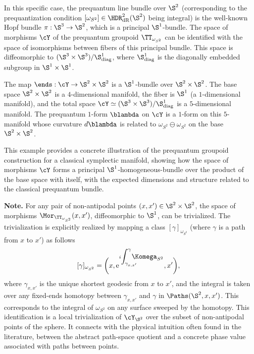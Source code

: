 \begin{article}
    In this specific case,
    the prequantum line bundle over $\S^2$ (corresponding to the prequantization condition $[\omega_{S^2}] \in \HDR^2_{\mathrm{dR}}(\S^2)$ being integral) is the well-known Hopf bundle $\pi: \S^3 \to \S^2$,
    which is a principal $\S^1$-bundle.
    The space of morphisms $\cY$ of the prequantum groupoid $\TT_{\omega_{S^2}}$ can be identified with the space of isomorphisms between fibers of this principal bundle.
    This space is diffeomorphic to $(\S^3 \times \S^3) / \S^1_{\text{diag}}$,
    where $\S^1_{\text{diag}}$ is the diagonally embedded subgroup in $\S^1 \times \S^1$.
    
    The map $\ends: \cY \to \S^2 \times \S^2$ is a $\S^1$-bundle over $\S^2 \times \S^2$.
    The base space $\S^2 \times \S^2$ is a $4$-dimensional manifold,
    the fiber is $\S^1$ (a $1$-dimensional manifold),
    and the total space $\cY \simeq (\S^3 \times \S^3) / \S^1_{\text{diag}}$ is a $5$-dimensional manifold.
    The prequantum $1$-form $\blambda$ on $\cY$ is a $1$-form on this $5$-manifold whose curvature $d\blambda$ is related to $\omega_{S^2} \ominus \omega_{S^2}$ on the base $\S^2 \times \S^2$.
    
    This example provides a concrete illustration of the prequantum groupoid construction for a classical symplectic manifold,
    showing how the space of morphisms $\cY$ forms a principal $\S^1$-homogeneous-bundle over the product of the base space with itself,
    with the expected dimensions and structure related to the classical prequantum bundle.
    
    \smallskip
    \textbf{Note.} For any pair of non-antipodal points $(x,x') \in \S^2 \times \S^2$,
    the space of morphisms $\Mor_{\TT_{\omega_{S^2}}}(x,x')$,
    diffeomorphic to $\S^1$,
    can be trivialized.
    The trivialization is explicitly realized by mapping a class $[\gamma]_{\omega_{S^2}}$ (where $\gamma$ is a path from $x$ to $x'$) as follows
    $$
      [\gamma]_{\omega_{S^2}} = \bigg(x, \mathrm{e}^{i {\displaystyle \int_{\gamma_{x,x'}}^\gamma \hspace{-1em}\Komega_{S^2}}},x'\bigg),
      $$
    where $\gamma_{x,x'}$ is the unique shortest geodesic from $x$ to $x'$,
    and the integral is taken over any fixed-ends homotopy between $\gamma_{x,x'}$ and $\gamma$ in $\Paths(\S^2,x,x')$.
    This corresponds to the integral of $\omega_{S^2}$ on any surface sweeped by the homotopy.
    This identification is a local trivialization of $\cY_{\S^2}$ over the subset of non-antipodal points of the sphere.
    It connects with the physical intuition often found in the literature,
    between the abstract path-space quotient and a concrete phase value associated with paths between points.
    
  \end{article}
  
